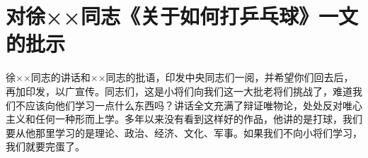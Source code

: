 \section[对徐××同志《关于如何打乒乓球》一文的批示（一九六五年一月十二日）]{对徐××同志《关于如何打乒乓球》一文的批示}


徐××同志的讲话和××同志的批语，印发中央同志们一阅，并希望你们回去后，再加印发，以广宣传。同志们，这是小将们向我们这一大批老将们挑战了，难道我们不应该向他们学习一点什么东西吗？讲话全文充满了辩证唯物论，处处反对唯心主义和任何一种形而上学。多年以来没有看到这样好的作品，他讲的是打球，我们要从他那里学习的是理论、政治、经济、文化、军事。如果我们不向小将们学习，我们就要完蛋了。


